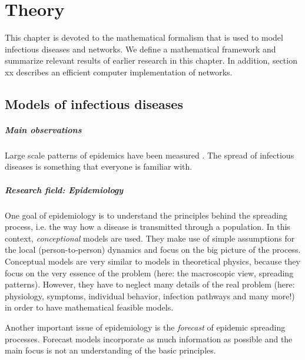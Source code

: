 \documentclass[openright,twoside,headsepline]{scrbook}
\begin{document}
\graphicspath{{/Users/lentz/Documents/GitHub_locals/Thesis/images/}}
\tableofcontents



\chapter{Theory}
This chapter is devoted to the mathematical formalism that is used to model infectious diseases and networks.
We define a mathematical framework and summarize relevant results of earlier research in this chapter.
In addition, section xx describes an efficient computer implementation of networks.

\section{Models of infectious diseases}
\paragraph{Main observations\color{Cayenne}{.}} Large scale patterns of epidemics have been measured \citep{giehl:2012}.
The spread of infectious diseases is something that everyone is familiar with.

\paragraph{Research field: Epidemiology\color{Cayenne}{.}} One goal of epidemiology is to understand the principles behind the spreading process, i.e. the way how a disease is transmitted through a population.
In this context, \emph{conceptional} models are used.
They make use of simple assumptions for the local (person-to-person) dynamics and focus on the big picture of the process.
Conceptual models are very similar to models in theoretical physics, because they focus on the very essence of the problem (here: the macroscopic view, spreading patterns).
However, they have to neglect many details of the real problem (here: physiology, symptoms, individual behavior, infection pathways and many more!) in order to have mathematical feasible models.

Another important issue of epidemiology is the \emph{forecast} of epidemic spreading processes.
Forecast models incorporate as much information as possible and the main focus is not an understanding of the basic principles.
\end{document}

